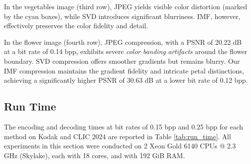In the vegetables image (third row), JPEG yields visible color distortion (marked by the cyan boxes), while SVD introduces significant blurriness. IMF, however, effectively preserves the color fidelity and detail.

In the flower image (fourth row), JPEG compression, with a PSNR of 20.22 dB at a bit rate of 0.14 bpp, exhibits severe \emph{color banding artifacts} around the flower boundary. SVD compression offers smoother gradients but remains blurry. Our IMF compression maintains the gradient fidelity and intricate petal distinctions, achieving a significantly higher PSNR of 30.63 dB at a lower bit rate of 0.12 bpp.


\subsection{Run Time} \label{sec:run_time}

The encoding and decoding times  at bit rates of 0.15 bpp and 0.25 bpp for each method on Kodak and CLIC 2024 are reported in Table \ref{tab:run_time}. All experiments in this section were conducted on 2 Xeon Gold 6140 CPUs @ 2.3 GHz (Skylake), each with 18 cores, and with 192 GiB RAM.

